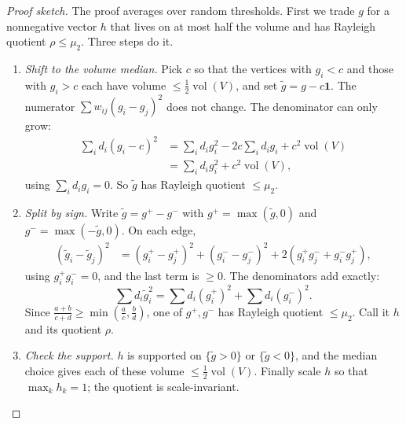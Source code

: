 \begin{proof}[Proof sketch]
The proof averages over random thresholds. First we trade $g$ for a nonnegative vector $h$ that lives on at most half the volume and has Rayleigh quotient $\rho\le\mu_2$. Three steps do it.
\begin{enumerate}
  \item \emph{Shift to the volume median.} Pick $c$ so that the vertices with $g_i<c$ and those with $g_i>c$ each have volume $\le\tfrac12\operatorname{vol}(V)$, and set $\tilde g=g-c\mathbf{1}$. The numerator $\sum w_{ij}(g_i-g_j)^2$ does not change. The denominator can only grow:
  \begin{align*}
    \sum_i d_i(g_i-c)^2 &= \sum_i d_i g_i^2 - 2c\sum_i d_i g_i + c^2\operatorname{vol}(V) \\
    &= \sum_i d_i g_i^2 + c^2\operatorname{vol}(V),
  \end{align*}
  using $\sum_i d_i g_i=0$. So $\tilde g$ has Rayleigh quotient $\le\mu_2$.
  \item \emph{Split by sign.} Write $\tilde g=g^+-g^-$ with $g^+=\max(\tilde g,0)$ and $g^-=\max(-\tilde g,0)$. On each edge,
  \begin{align*}
    (\tilde g_i-\tilde g_j)^2 &= (g^+_i-g^+_j)^2 + (g^-_i-g^-_j)^2 + 2(g^+_i g^-_j + g^-_i g^+_j),
  \end{align*}
  using $g^+_i g^-_i=0$, and the last term is $\ge0$. The denominators add exactly:
  \[
    \sum d_i\tilde g_i^2 = \sum d_i(g^+_i)^2 + \sum d_i(g^-_i)^2 .
  \] Since $\frac{a+b}{c+d}\ge\min(\frac ac,\frac bd)$, one of $g^+,g^-$ has Rayleigh quotient $\le\mu_2$. Call it $h$ and its quotient $\rho$.
  \item \emph{Check the support.} $h$ is supported on $\{\tilde g>0\}$ or $\{\tilde g<0\}$, and the median choice gives each of these volume $\le\tfrac12\operatorname{vol}(V)$. Finally scale $h$ so that $\max_k h_k=1$; the quotient is scale-invariant.
\end{enumerate}


\end{proof}
